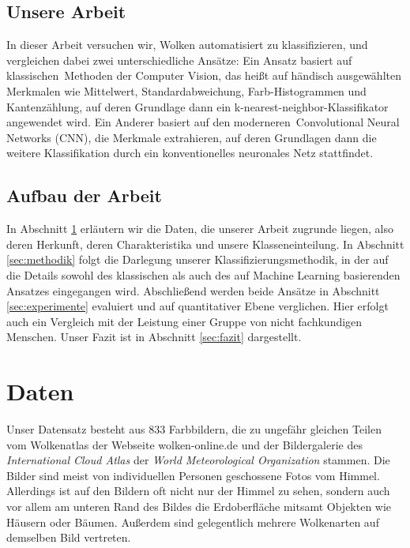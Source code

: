 \documentclass[a4,german]{article}
\begin{document}
\subsection{Unsere Arbeit}

In dieser Arbeit versuchen wir, Wolken automatisiert zu klassifizieren, und vergleichen dabei zwei unterschiedliche Ansätze:
Ein Ansatz basiert auf \glqq klassischen\grqq\ Methoden der Computer Vision, das heißt auf händisch ausgewählten Merkmalen wie Mittelwert, Standardabweichung, Farb-Histogrammen und Kantenzählung, auf deren Grundlage dann ein k-nearest-neighbor-Klassifikator angewendet wird.
Ein Anderer basiert auf den \glqq moderneren\grqq\ Convolutional Neural Networks (CNN), die Merkmale extrahieren, auf deren Grundlagen dann die weitere Klassifikation durch ein konventionelles neuronales Netz stattfindet.


\subsection{Aufbau der Arbeit}

In Abschnitt \ref{sec:daten} erläutern wir die Daten, die unserer Arbeit zugrunde liegen, also deren Herkunft, deren Charakteristika und unsere Klasseneinteilung.
In Abschnitt \ref{sec:methodik} folgt die Darlegung unserer Klassifizierungsmethodik, in der auf die Details sowohl des klassischen als auch des auf Machine Learning basierenden Ansatzes eingegangen wird.
Abschließend werden beide Ansätze in Abschnitt \ref{sec:experimente} evaluiert und auf quantitativer Ebene verglichen. Hier erfolgt auch ein Vergleich mit der Leistung einer Gruppe von nicht fachkundigen Menschen.
Unser Fazit ist in Abschnitt \ref{sec:fazit} dargestellt.


\section{Daten}
\label{sec:daten}

Unser Datensatz besteht aus 833 Farbbildern, die zu ungefähr gleichen Teilen vom Wolkenatlas der Webseite wolken-online.de \cite{wolkenonline} und der Bildergalerie des \emph{International Cloud Atlas} der \emph{World Meteorological Organization} \cite{wmo:images} stammen.
Die Bilder sind meist von individuellen Personen geschossene Fotos vom Himmel.
Allerdings ist auf den Bildern oft nicht nur der Himmel zu sehen, sondern auch vor allem am unteren Rand des Bildes die Erdoberfläche mitsamt Objekten wie Häusern oder Bäumen.
Außerdem sind gelegentlich mehrere Wolkenarten auf demselben Bild vertreten.
\end{document}
